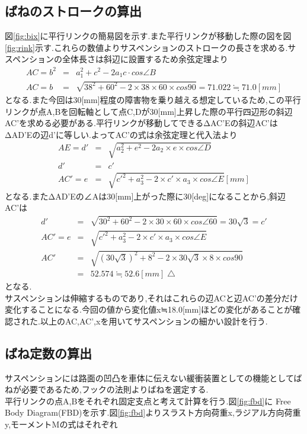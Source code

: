 \documentclass[11pt]{jsarticle}
\begin{document}
\subsection{ばねのストロークの算出}
図\ref{fig:bix}に平行リンクの簡易図を示す.また平行リンクが移動した際の図を図\ref{fig:rink}示す.これらの数値よりサスペンションのストロークの長さを求める.サスペンションの全体長さは斜辺に設置するため余弦定理より
\begin{eqnarray}
   AC = b^2 & = & a_1^2+c^2-2a_1c\cdot cos∠B \\
  AC = b & = & \sqrt{38^2+60^2-2\times 38\times 60\times cos90} = 71.022 ≒　71.0 [mm]
\end{eqnarray}
となる.また今回は30[mm]程度の障害物を乗り越える想定しているため,この平行リンクが点A,Bを回転軸として点C,Dが30[mm]上昇した際の平行四辺形の斜辺AC'を求める必要がある.平行リンクが移動してできるΔAC'Eの斜辺AC'はΔAD'Eの辺d'に等しい.よってAC'の式は余弦定理と代入法より
\begin{eqnarray}
	AE = d' &= & \sqrt{a_2^2+e^2-2a_2\times e\times cos∠D} \\
	d' & = & c' \\
	AC'= e & = & \sqrt{c'^2+a_3^2-2\times c'\times a_3\times cos∠E} [mm]
\end{eqnarray}
となる.またΔAD'Eの∠Aは30[mm]上がった際に30[deg]になることから,斜辺AC'は
\begin{eqnarray}
	d' &=& \sqrt{30^2+60^2-2\times 30\times 60\times cos∠60} = 30\sqrt{3}=c' \\
	AC'= e & = & \sqrt{c'^2+a_3^2-2\times c'\times a_3\times cos∠E}  \\
	AC'& = & \sqrt{(30\sqrt{3})^2+8^2-2\times 30\sqrt{3}\times 8\times cos90} \\
	& = & 52.574 ≒ 52.6 [mm]\bigtriangleup
\end{eqnarray}
となる.　\\
サスペンションは伸縮するものであり,それはこれらの辺ACと辺AC'の差分だけ変化することになる.今回の値から変化値x≒18.0[mm]ほどの変化があることが確認された.以上のAC,AC',xを用いてサスペンションの細かい設計を行う.

\subsection{ばね定数の算出}
サスペンションには路面の凹凸を車体に伝えない緩衝装置としての機能としてばねが必要であるため,フックの法則よりばねを選定する.　\\
平行リンクの点A,Bをそれぞれ固定支点と考えて計算を行う.図\ref{fig:fbd}に Free Body Diagram(FBD)を示す.図\ref{fig:fbd}よりスラスト方向荷重x,ラジアル方向荷重y,モーメントMの式はそれぞれ
\end{document}
